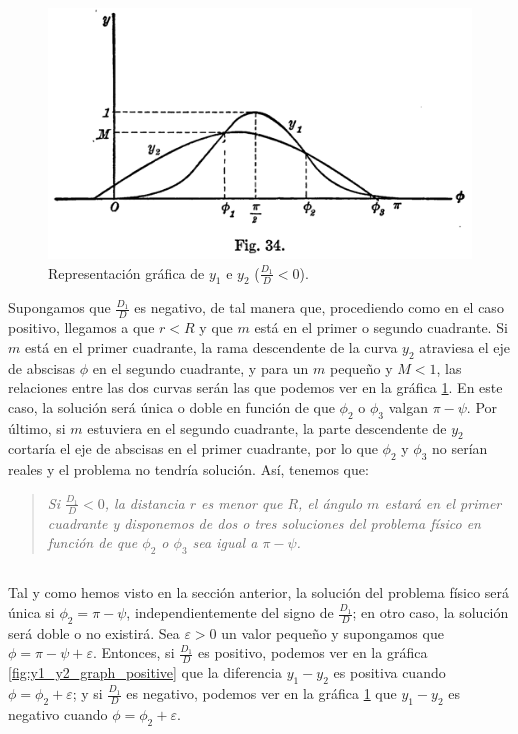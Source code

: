 \documentclass[11pt]{article}
\begin{document}
\begin{figure}[H]
\centering
\includegraphics[scale=0.55]{images/fig_34.png}
\caption{Representación gráfica de $y_1$ e $y_2$ ($\frac{D_1}{D}<0$).}
\label{fig:y1_y2_graph_negative}
\end{figure}

Supongamos que $\frac{D_1}{D}$ es negativo, de tal manera que, procediendo como en el caso positivo, llegamos a que $r<R$ y que $m$ está en el primer o segundo cuadrante. Si $m$ está en el primer cuadrante, la rama descendente de la curva $y_2$ atraviesa el eje de abscisas $\phi$ en el segundo cuadrante, y para un $m$ pequeño y $M<1$, las relaciones entre las dos curvas serán las que podemos ver en la gráfica \ref{fig:y1_y2_graph_negative}. En este caso, la solución será única o doble en función de que $\phi_2$ o $\phi_3$ valgan $\pi-\psi$. Por último, si $m$ estuviera en el segundo cuadrante, la parte descendente de $y_2$ cortaría el eje de abscisas en el primer cuadrante, por lo que $\phi_2$ y $\phi_3$ no serían reales y el problema no tendría solución. Así, tenemos que:
\begin{quote}
\textit{Si $\frac{D_1}{D}<0$, la distancia $r$ es menor que $R$, el ángulo $m$ estará en el primer cuadrante y disponemos de dos o tres soluciones del problema físico en función de que $\phi_2$ o $\phi_3$ sea igual a $\pi-\psi$.}\\
\end{quote}



\subsection{}
\label{subsec:unicidad}
Tal y como hemos visto en la sección anterior, la solución del problema físico será única si $\phi_2=\pi-\psi$, independientemente del signo de $\frac{D_1}{D}$; en otro caso, la solución será doble o no existirá. Sea $\varepsilon>0$ un valor pequeño y supongamos que $\phi=\pi-\psi+\varepsilon$. Entonces, si $\frac{D_1}{D}$ es positivo, podemos ver en la gráfica \ref{fig:y1_y2_graph_positive} que la diferencia $y_1-y_2$ es positiva cuando $\phi=\phi_2+\varepsilon$; y si $\frac{D_1}{D}$ es negativo, podemos ver en la gráfica \ref{fig:y1_y2_graph_negative} que $y_1-y_2$ es negativo cuando $\phi=\phi_2+\varepsilon$.\\
\end{document}
